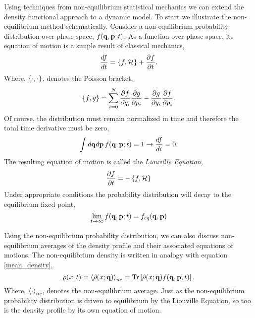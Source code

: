 Using techniques from non-equilibrium statistical mechanics we can extend
the density functional approach to a dynamic model. To start we illustrate the 
non-equilibrium method schematically. Consider a non-equilibrium probability 
distribution over phase space, $f(\mathbf{q}, \mathbf{p}; t)$. As a function over phase space,
its equation of motion is a simple result of classical mechanics,
%
\begin{equation}
    \frac{d f}{dt} = \left\lbrace f, \mathcal{H} \right\rbrace + \frac{\partial f}{\partial t}.
\end{equation}
%
Where, $\left\lbrace \cdot, \cdot \right\rbrace$, denotes the Poisson bracket,
%
\begin{equation}
    \left\lbrace f, g \right\rbrace = \sum_{i = 0}^N \frac{\partial f}{\partial q_i}
        \frac{\partial g}{\partial p_i} - \frac{\partial g}{\partial q_i}
        \frac{\partial f}{\partial p_i}.
\end{equation}
%
Of course, the distribution must remain normalized in time and therefore the 
total time derivative must be zero,
%
\begin{equation}
    \int d\mathbf{q} d\mathbf{p}\, f(\mathbf{q}, \mathbf{p}; t) = 1 \rightarrow \frac{d f}{dt} = 0.
\end{equation}
%
The resulting equation of motion is called the \textit{Liouville Equation},
%
\begin{equation}
    \label{liouville} 
    \frac{\partial f}{\partial t} = - \left\lbrace f , \mathcal{H} \right\rbrace
\end{equation}
%
Under appropriate conditions the probability distribution will decay to the
equilibrium fixed point,
%
\begin{equation}
    \lim_{t \rightarrow \infty} f(\mathbf{q}, \mathbf{p}; t) = f_{eq}(\mathbf{q}, \mathbf{p})
\end{equation}
%

Using the non-equilibrium probability distribution, we can also discuss
non-equilibrium averages of the density profile and their associated equations
of motions. The non-equilibrium density is written in analogy with equation
\ref{mean_density},
%
\begin{equation}
    \rho(x, t) = \left\langle \hat{\rho}(x; \mathbf{q}) \right\rangle_{ne} =
        \mathrm{Tr}\left[ \hat{\rho}(x; \mathbf{q}) f(\mathbf{q}, \mathbf{p}, t) \right].
\end{equation}
%
Where, $\left\langle \cdot \right\rangle_{ne}$, denotes the non-equilibrium average. Just as the
non-equilibrium probability distribution is driven to equilibrium by the
Liouville Equation, so too is the density profile by its own equation of
motion.

